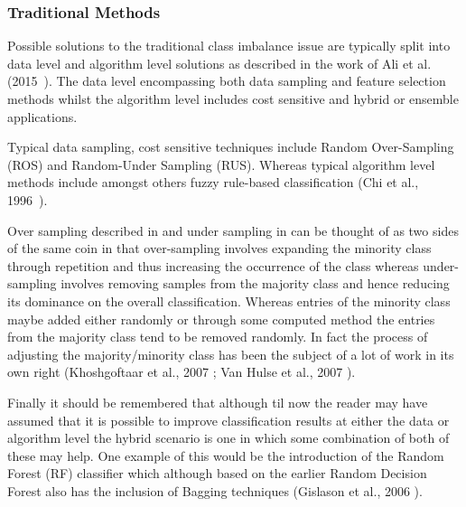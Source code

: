 

\subsubsection{Traditional Methods}\label{sec:TradMethods}
Possible solutions to the traditional class imbalance issue are typically split into data level and algorithm level solutions as described in the work of Ali et al. (2015~\cite{ali2015classification}). The data level encompassing both data sampling and feature selection methods whilst the algorithm level includes cost sensitive and hybrid or ensemble applications.
\par
Typical data sampling, cost sensitive techniques include Random Over-Sampling (ROS) and Random-Under Sampling (RUS). Whereas typical algorithm level methods include amongst others fuzzy rule-based classification (Chi et al., 1996~\cite{chi1996fuzzy}).
\par
Over sampling described in  and under sampling in  can be thought of as two sides of the same coin in that over-sampling involves expanding the minority class through repetition and thus increasing the occurrence of the class whereas under-sampling involves removing samples from the majority class and hence reducing its dominance on the overall classification. Whereas entries of the minority class maybe added either randomly or through some computed method the entries from the majority class tend to be removed randomly. In fact the process of adjusting the majority/minority class has been the subject of a lot of work in its own right (Khoshgoftaar et al., 2007  \cite{khoshgoftaar2007learning}; Van Hulse et al., 2007 \cite{van2007experimental}).
\par
Finally it should be remembered that although til now the reader may have assumed that it is possible to improve classification results at either the data or algorithm level the hybrid scenario is one in which some combination of both of these may help. One example of this would be the introduction of the Random Forest (RF) classifier which although based on the earlier Random Decision Forest also has the inclusion of Bagging techniques (Gislason et al., 2006 \cite{gislason2006random}).

